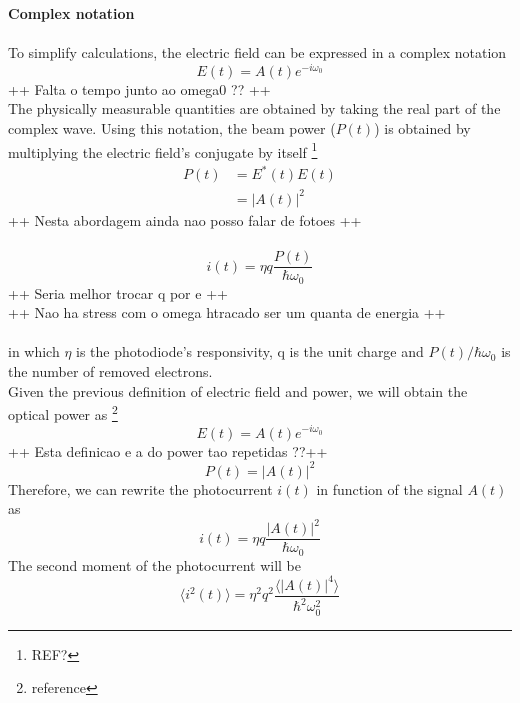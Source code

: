 \begin{bibunit}[plain]
{\bf Complex notation}\\
\\
To simplify calculations, the electric field can be expressed in a complex notation
\cite{fox2006} %
\begin{equation}
	E(t) = A(t) e^{-i \omega_0}
\end{equation}
++ Falta o tempo junto ao omega0 ?? ++\\
The physically measurable quantities are obtained by taking the real part of the complex wave. Using this notation, the beam power ($P(t)$) is obtained by multiplying the electric field's conjugate by itself
\footnote{REF?}
\begin{align}
	P(t) &= E^{*}(t) E(t)\nonumber\\
         &= |A(t)|^2
\end{align}
++ Nesta abordagem ainda nao posso falar de fotoes ++\\
\\
\begin{equation}
	i(t) = \eta q \frac{P(t)}{\hbar \omega_0}
\end{equation}
++ Seria melhor trocar q por e ++\\
++ Nao ha stress com o omega htracado ser um quanta de energia ++\\
\\
in which $\eta$ is the photodiode's responsivity, q is the unit charge and $P(t)/\hbar \omega_0$ is the number of removed electrons.\\
Given the previous definition of electric field and power, we will obtain the optical power as
\footnote{reference}
\begin{equation}
	E(t) = A(t) e^{-i \omega_0}
\end{equation}
++ Esta definicao e a do power tao repetidas ??++
\begin{equation}
	P(t) = |A(t)|^2
	\label{eq:power}
\end{equation}
Therefore, we can rewrite the photocurrent $i(t)$ in function of the signal $A(t)$ as
\begin{equation}
	i(t) = \eta q \frac{|A(t)|^2}{\hbar \omega_0}
\end{equation}
The second moment of the photocurrent will be
\begin{equation}
	\langle i^2(t) \rangle = \eta^2 q^2 \frac{\langle |A(t)|^4 \rangle }{\hbar^2 \omega_0^2}
\end{equation}



\end{bibunit}

